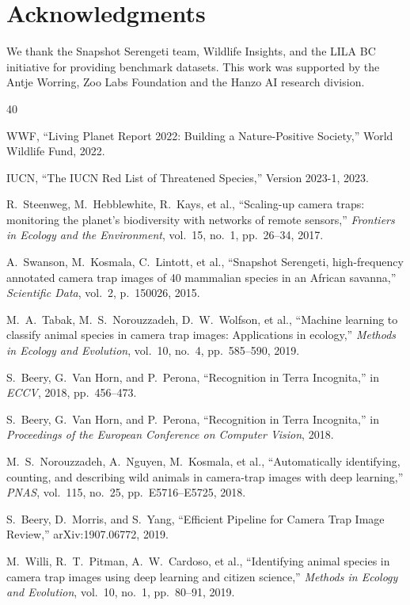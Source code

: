 \section*{Acknowledgments}

We thank the Snapshot Serengeti team, Wildlife Insights, and the LILA BC initiative for providing benchmark datasets. This work was supported by the Antje Worring, Zoo Labs Foundation and the Hanzo AI research division.

\begin{thebibliography}{40}

WWF, ``Living Planet Report 2022: Building a Nature-Positive Society,'' World Wildlife Fund, 2022.

IUCN, ``The IUCN Red List of Threatened Species,'' Version 2023-1, 2023.

R.~Steenweg, M.~Hebblewhite, R.~Kays, et al., ``Scaling-up camera traps: monitoring the planet's biodiversity with networks of remote sensors,'' \emph{Frontiers in Ecology and the Environment}, vol.~15, no.~1, pp.~26--34, 2017.

A.~Swanson, M.~Kosmala, C.~Lintott, et al., ``Snapshot Serengeti, high-frequency annotated camera trap images of 40 mammalian species in an African savanna,'' \emph{Scientific Data}, vol.~2, p.~150026, 2015.

M.~A.~Tabak, M.~S.~Norouzzadeh, D.~W.~Wolfson, et al., ``Machine learning to classify animal species in camera trap images: Applications in ecology,'' \emph{Methods in Ecology and Evolution}, vol.~10, no.~4, pp.~585--590, 2019.

S.~Beery, G.~Van Horn, and P.~Perona, ``Recognition in Terra Incognita,'' in \emph{ECCV}, 2018, pp.~456--473.

S.~Beery, G.~Van Horn, and P.~Perona, ``Recognition in Terra Incognita,'' in \emph{Proceedings of the European Conference on Computer Vision}, 2018.

M.~S.~Norouzzadeh, A.~Nguyen, M.~Kosmala, et al., ``Automatically identifying, counting, and describing wild animals in camera-trap images with deep learning,'' \emph{PNAS}, vol.~115, no.~25, pp.~E5716--E5725, 2018.

S.~Beery, D.~Morris, and S.~Yang, ``Efficient Pipeline for Camera Trap Image Review,'' arXiv:1907.06772, 2019.

M.~Willi, R.~T.~Pitman, A.~W.~Cardoso, et al., ``Identifying animal species in camera trap images using deep learning and citizen science,'' \emph{Methods in Ecology and Evolution}, vol.~10, no.~1, pp.~80--91, 2019.


\end{thebibliography}
